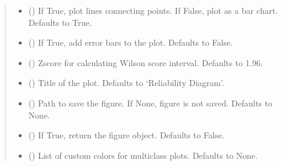 \documentclass[letterpaper,10pt,english]{sphinxmanual}
\begin{document}
\begin{fulllineitems}
\begin{quote}
\begin{description}
\begin{itemize}
\item {} 
\sphinxAtStartPar
{} (\sphinxstyleliteralemphasis{\sphinxupquote{, }}) \textendash{} If True, plot lines connecting points. If False, plot as a bar chart. Defaults to True.

\item {} 
\sphinxAtStartPar
{} (\sphinxstyleliteralemphasis{\sphinxupquote{, }}) \textendash{} If True, add error bars to the plot. Defaults to False.

\item {} 
\sphinxAtStartPar
{} (\sphinxstyleliteralemphasis{\sphinxupquote{, }}) \textendash{} Z\sphinxhyphen{}score for calculating Wilson score interval. Defaults to 1.96.

\item {} 
\sphinxAtStartPar
{} (\sphinxstyleliteralemphasis{\sphinxupquote{, }}) \textendash{} Title of the plot. Defaults to ‘Reliability Diagram’.

\item {} 
\sphinxAtStartPar
{} (\sphinxstyleliteralemphasis{\sphinxupquote{, }}) \textendash{} Path to save the figure. If None, figure is not saved. Defaults to None.

\item {} 
\sphinxAtStartPar
{} (\sphinxstyleliteralemphasis{\sphinxupquote{, }}) \textendash{} If True, return the figure object. Defaults to False.

\item {} 
\sphinxAtStartPar
{} (\sphinxstyleliteralemphasis{\sphinxupquote{, }}) \textendash{} List of custom colors for multi\sphinxhyphen{}class plots. Defaults to None.


\end{itemize}
\end{description}
\end{quote}
\end{fulllineitems}
\end{document}
